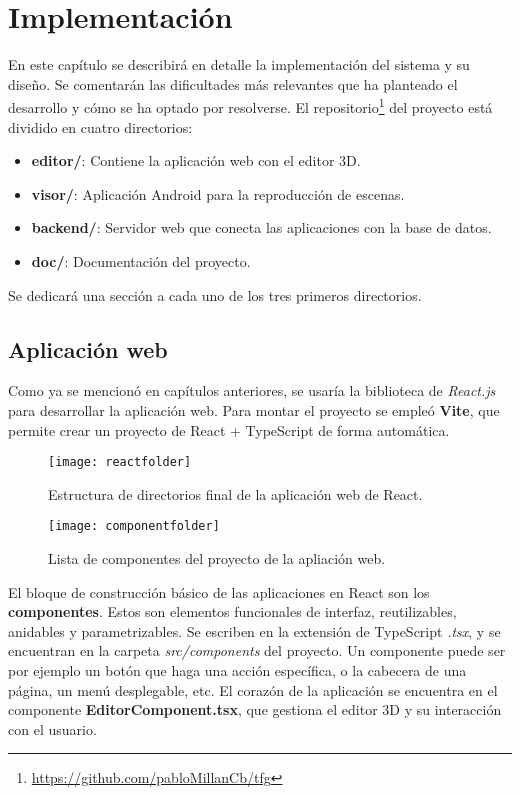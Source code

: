 \chapter{Implementación}

En este capítulo se describirá en detalle la implementación del sistema y su diseño. Se comentarán las dificultades más relevantes que ha planteado el desarrollo y cómo se ha optado por resolverse. El repositorio\footnote{\url{https://github.com/pabloMillanCb/tfg}} del proyecto está dividido en cuatro directorios:

\begin{itemize}
    \item \textbf{editor/}: Contiene la aplicación web con el editor 3D.
    \item \textbf{visor/}: Aplicación Android para la reproducción de escenas.
    \item \textbf{backend/}: Servidor web que conecta las aplicaciones con la base de datos.
    \item \textbf{doc/}: Documentación del proyecto.
\end{itemize}

Se dedicará una sección a cada uno de los tres primeros directorios.


\section{Aplicación web}

Como ya se mencionó en capítulos anteriores, se usaría la biblioteca de \textit{React.js}\cite{react} para desarrollar la aplicación web. Para montar el proyecto se empleó \textbf{Vite}\cite{vite}, que permite crear un proyecto de React + TypeScript de forma automática.

\begin{figure}[h]
    \centering
    \texttt{[image: reactfolder]}
    \caption[Estructura de directorios de React]{Estructura de directorios final de la aplicación web de React.}
    \label{fig:reactfolder}
\end{figure}

\begin{figure}[h]
    \centering
    \texttt{[image: componentfolder]}
    \caption[Componentes del proyecto React]{Lista de componentes del proyecto de la apliación web.}
    \label{fig:componentfolder}
\end{figure}

El bloque de construcción básico de las aplicaciones en React son los \textbf{componentes}. Estos son elementos funcionales de interfaz, reutilizables, anidables y parametrizables. Se escriben en la extensión de TypeScript \textit{.tsx}, y se encuentran en la carpeta \textit{src/components} del proyecto. Un componente puede ser por ejemplo un botón que haga una acción específica, o la cabecera de una página, un menú desplegable, etc. El corazón de la aplicación se encuentra en el componente \textbf{EditorComponent.tsx}, que gestiona el editor 3D y su interacción con el usuario.

